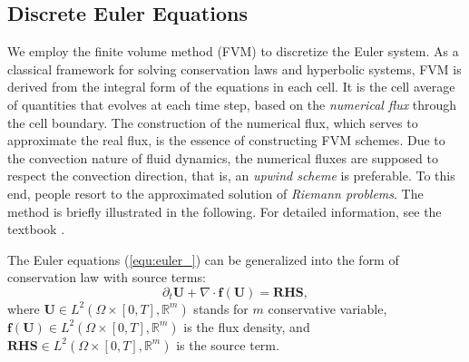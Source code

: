 \documentclass{article}
\begin{document}
\subsection{Discrete Euler Equations}
We employ the finite volume method (FVM) to discretize the Euler system. As a classical framework for solving conservation laws and hyperbolic systems, FVM is derived from the integral form of the equations in each cell. It is the cell average of quantities that evolves at each time step, based on the \emph{numerical flux} through the cell boundary. The construction of the numerical flux, which serves to approximate the real flux, is the essence of constructing FVM schemes. Due to the convection nature of fluid dynamics, the numerical fluxes are supposed to respect the convection direction, that is, an \emph{upwind scheme} is preferable. To this end, people resort to the approximated solution of \emph{Riemann problems}. The method is briefly illustrated in the following. For detailed information, see the textbook \cite{leveque_2002}.

The Euler equations (\ref{equ:euler_}) can be generalized into the form of conservation law with source terms:
\begin{equation} \label{equ:euler_conservation}
    \partial_t \mathbf{U} + \nabla \cdot \mathbf{f}(\mathbf{U}) = \mathbf{RHS},
\end{equation}
where $\mathbf{U} \in L^2(\Omega \times [0,T], \mathbb{R}^m)$ stands for $m$ conservative variable, $\mathbf{f}(\mathbf{U}) \in L^2(\Omega \times  [0,T], \mathbb{R}^m)$ is the flux density, and $\mathbf{RHS} \in L^2(\Omega \times  [0,T], \mathbb{R}^m)$ is the source term. 
\end{document}

